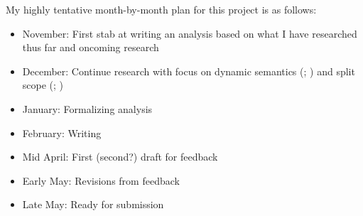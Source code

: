 \documentclass[11pt]{article}
\begin{document}
My highly tentative month-by-month plan for this project is as follows:
\begin{itemize}
	\item {November: First stab at writing an analysis based on what I have researched thus far and oncoming research}
	\item {December: Continue research with focus on dynamic semantics (\cite{heimSemanticsDefiniteIndefinite1982}; \cite{groenendijkDynamicPredicateLogic1991}) and split scope (\cite{abelsUnifiedApproachSplit2010}; \cite{bumfordSplitscopeEffectsDefinite2017})}
	\item {January: Formalizing analysis}
	\item {February: Writing}
	\item {Mid April: First (second?) draft for feedback}
	\item {Early May: Revisions from feedback}
	\item {Late May: Ready for submission}
\end{itemize}

\end{document}
